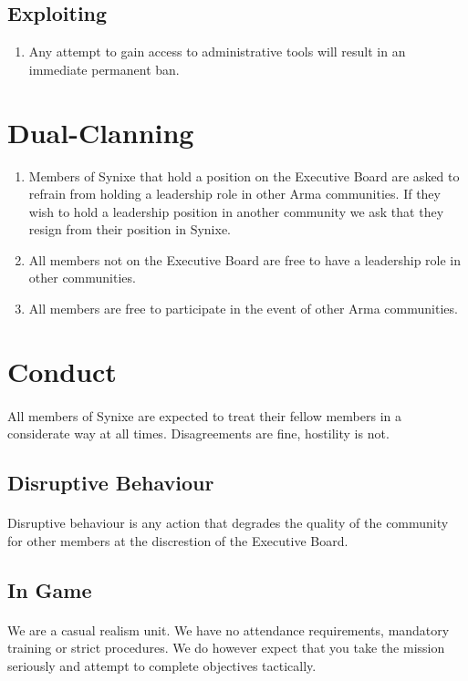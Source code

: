 \documentclass[10pt,a4paper]{article}
\begin{document}
\subsection{Exploiting}
\begin{enumerate}
	\item Any attempt to gain access to administrative tools will result in an immediate permanent ban.
\end{enumerate}
\section{Dual-Clanning} \label{dual-clan}
\begin{enumerate}
	\item Members of Synixe that hold a position on the Executive Board are asked to refrain from holding a leadership role in other Arma communities. If they wish to hold a leadership position in another community we ask that they resign from their position in Synixe.
	\item All members not on the Executive Board are free to have a leadership role in other communities.
	\item All members are free to participate in the event of other Arma communities.
\end{enumerate}
\section{Conduct} \label{conduct}
\paragraph{}
All members of Synixe are expected to treat their fellow members in a considerate way at all times. Disagreements are fine, hostility is not.
\subsection{Disruptive Behaviour}
\paragraph{}
Disruptive behaviour is any action that degrades the quality of the community for other members at the discrestion of the Executive Board.
\subsection{In Game}
\paragraph{}
We are a casual realism unit. We have no attendance requirements, mandatory training or strict procedures. We do however expect that you take the mission seriously and attempt to complete objectives tactically.
\end{document}

